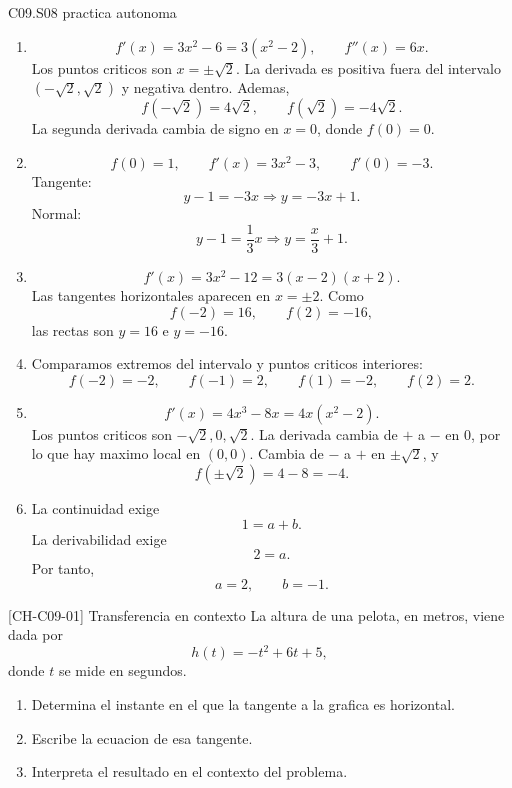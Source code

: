 \begin{fullsolution}{C09.S08 practica autonoma}
\begin{enumerate}[label=\textbf{PX-C09.S08-\arabic*:}, leftmargin=*]
  \item
  \[
  f'(x)=3x^2-6=3(x^2-2),\qquad f''(x)=6x.
  \]
  Los puntos criticos son \(x=\pm \sqrt{2}\). La derivada es positiva fuera del intervalo
  \((-\sqrt{2},\sqrt{2})\) y negativa dentro. Ademas,
  \[
  f(-\sqrt{2})=4\sqrt{2},\qquad f(\sqrt{2})=-4\sqrt{2}.
  \]
  La segunda derivada cambia de signo en \(x=0\), donde \(f(0)=0\).
  \item
  \[
  f(0)=1,\qquad f'(x)=3x^2-3,\qquad f'(0)=-3.
  \]
  Tangente:
  \[
  y-1=-3x\Longrightarrow y=-3x+1.
  \]
  Normal:
  \[
  y-1=\frac{1}{3}x\Longrightarrow y=\frac{x}{3}+1.
  \]
  \item
  \[
  f'(x)=3x^2-12=3(x-2)(x+2).
  \]
  Las tangentes horizontales aparecen en \(x=\pm 2\). Como
  \[
  f(-2)=16,\qquad f(2)=-16,
  \]
  las rectas son \(y=16\) e \(y=-16\).
  \item Comparamos extremos del intervalo y puntos criticos interiores:
  \[
  f(-2)=-2,\qquad f(-1)=2,\qquad f(1)=-2,\qquad f(2)=2.
  \]
  \item
  \[
  f'(x)=4x^3-8x=4x(x^2-2).
  \]
  Los puntos criticos son \(-\sqrt{2},0,\sqrt{2}\). La derivada cambia de \(+\) a \(-\) en
  \(0\), por lo que hay maximo local en \((0,0)\). Cambia de \(-\) a \(+\) en
  \(\pm \sqrt{2}\), y
  \[
  f(\pm \sqrt{2})=4-8=-4.
  \]
  \item La continuidad exige
  \[
  1=a+b.
  \]
  La derivabilidad exige
  \[
  2=a.
  \]
  Por tanto,
  \[
  a=2,\qquad b=-1.
  \]
\end{enumerate}
\end{fullsolution}

\begin{challenge}{[CH-C09-01] Transferencia en contexto}
La altura de una pelota, en metros, viene dada por
\[
h(t)=-t^2+6t+5,
\]
donde \(t\) se mide en segundos.

\begin{enumerate}
  \item Determina el instante en el que la tangente a la grafica es horizontal.
  \item Escribe la ecuacion de esa tangente.
  \item Interpreta el resultado en el contexto del problema.
\end{enumerate}
\end{challenge}

